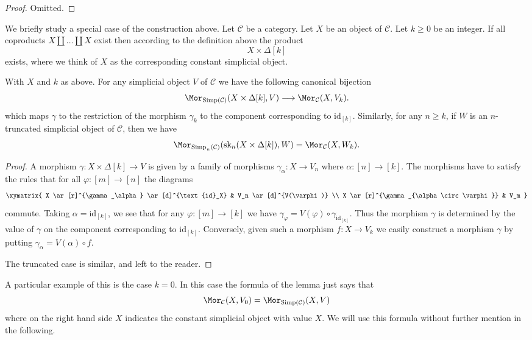 \begin{proof}
Omitted.
\end{proof}

\noindent
We briefly study a special case of the construction
above. Let $\mathcal{C}$ be a category.
Let $X$ be an object of $\mathcal{C}$.
Let $k \geq 0$ be an integer.
If all coproducts $X \amalg \ldots \amalg X$ exist
then according to the definition above the product
$$
X \times \Delta[k]
$$
exists, where we think of $X$ as the corresponding constant
simplicial object.

\begin{lemma}
\label{lemma-morphism-from-coproduct}
With $X$ and $k$ as above.
For any simplicial object $V$ of
$\mathcal{C}$ we have the following
canonical bijection
$$
\Mor_{\text{Simp}(\mathcal{C})}(X \times \Delta[k], V)
\longrightarrow
\Mor_\mathcal{C}(X, V_k).
$$
which maps $\gamma$ to the restriction of the
morphism $\gamma_k$ to the component corresponding
to $\text{id}_{[k]}$.
Similarly, for any $n \geq k$, if $W$ is an
$n$-truncated simplicial object
of $\mathcal{C}$, then we have
$$
\Mor_{\text{Simp}_n(\mathcal{C})}(\text{sk}_n(X \times \Delta[k]), W)
=
\Mor_\mathcal{C}(X, W_k).
$$
\end{lemma}

\begin{proof}
A morphism $\gamma : X \times \Delta[k] \to V$ is given by
a family of morphisms $\gamma_\alpha : X \to V_n$ where
$\alpha : [n] \to [k]$. The morphisms have to satisfy the
rules that for all $\varphi : [m] \to [n]$ the diagrams
$$
\xymatrix{
X \ar[r]^{\gamma_\alpha} \ar[d]^{\text{id}_X} & V_n \ar[d]^{V(\varphi)} \\
X \ar[r]^{\gamma_{\alpha \circ \varphi}} & V_m
}
$$
commute. Taking $\alpha = \text{id}_{[k]}$, we see that
for any $\varphi : [m] \to [k]$ we have $\gamma_\varphi =
V(\varphi) \circ \gamma_{\text{id}_{[k]}}$. Thus the morphism
$\gamma$ is determined by the value of $\gamma$ on the
component corresponding to $\text{id}_{[k]}$. Conversely,
given such a morphism $f : X \to V_k$ we easily
construct a morphism $\gamma$ by putting
$\gamma_\alpha = V(\alpha) \circ f$.

\medskip\noindent
The truncated case is similar, and left to the reader.
\end{proof}

\noindent
A particular example of this is the case $k = 0$.
In this case the formula of the lemma just says
that
$$
\Mor_\mathcal{C}(X, V_0)
=
\Mor_{\text{Simp}(\mathcal{C})}(X, V)
$$
where on the right hand side $X$ indicates the
constant simplicial object with value $X$. We will
use this formula without further mention in the
following.





